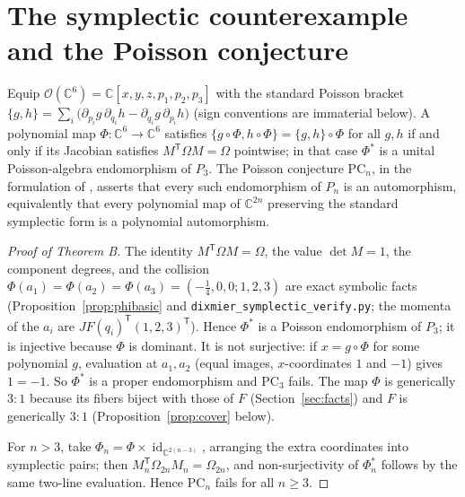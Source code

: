 \documentclass[11pt]{amsart}
\newcommand{\CC}{\mathbb{C}}
\newcommand{\id}{\operatorname{id}}
\newcommand{\PC}{\mathrm{PC}}
\theoremstyle{plain}
\theoremstyle{definition}
\theoremstyle{remark}
\begin{document}
\section{The symplectic counterexample and the Poisson conjecture}
\label{sec:poisson}

Equip $\mathcal{O}(\CC^{6})=\CC[x,y,z,p_{1},p_{2},p_{3}]$ with the
standard Poisson bracket
$\{g,h\}=\sum_{i}\bigl(\partial_{p_{i}}g\,\partial_{q_{i}}h-
\partial_{q_{i}}g\,\partial_{p_{i}}h\bigr)$ (sign conventions are
immaterial below). A polynomial map $\Phi\colon\CC^{6}\to\CC^{6}$
satisfies $\{g\circ\Phi,h\circ\Phi\}=\{g,h\}\circ\Phi$ for all $g,h$ if
and only if its Jacobian satisfies $M^{\mathsf T}\Omega M=\Omega$
pointwise; in that case $\Phi^{*}$ is a unital Poisson-algebra
endomorphism of $P_{3}$. The Poisson conjecture $\PC_{n}$, in the
formulation of \cite{AvdE07}, asserts that every such endomorphism of
$P_{n}$ is an automorphism, equivalently that every polynomial map of
$\CC^{2n}$ preserving the standard symplectic form is a polynomial
automorphism.

\begin{proof}[Proof of Theorem B]
The identity $M^{\mathsf T}\Omega M=\Omega$, the value $\det M=1$, the
component degrees, and the collision
$\Phi(a_{1})=\Phi(a_{2})=\Phi(a_{3})=(-\tfrac14,0,0;1,2,3)$ are exact
symbolic facts (Proposition~\ref{prop:phibasic} and
\texttt{dixmier\_symplectic\_verify.py}; the momenta of the $a_{i}$ are
$JF(q_{i})^{\mathsf T}(1,2,3)^{\mathsf T}$). Hence $\Phi^{*}$ is a Poisson
endomorphism of $P_{3}$; it is injective because $\Phi$ is dominant. It is
not surjective: if $x=g\circ\Phi$ for some polynomial $g$, evaluation at
$a_{1},a_{2}$ (equal images, $x$-coordinates $1$ and $-1$) gives $1=-1$.
So $\Phi^{*}$ is a proper endomorphism and $\PC_{3}$ fails. The map $\Phi$
is generically $3{:}1$ because its fibers biject with those of $F$
(Section~\ref{sec:facts}) and $F$ is generically $3{:}1$
(Proposition~\ref{prop:cover} below).

For $n>3$, take $\Phi_{n}=\Phi\times\id_{\CC^{2(n-3)}}$, arranging the
extra coordinates into symplectic pairs; then
$M_{n}^{\mathsf T}\Omega_{2n}M_{n}=\Omega_{2n}$, and non-surjectivity of
$\Phi_{n}^{*}$ follows by the same two-line evaluation. Hence $\PC_{n}$
fails for all $n\ge3$.
\end{proof}
\end{document}
